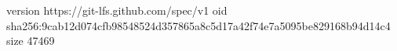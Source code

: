 version https://git-lfs.github.com/spec/v1
oid sha256:9cab12d074cfb98548524d357865a8c5d17a42f74e7a5095be829168b94d14c4
size 47469

